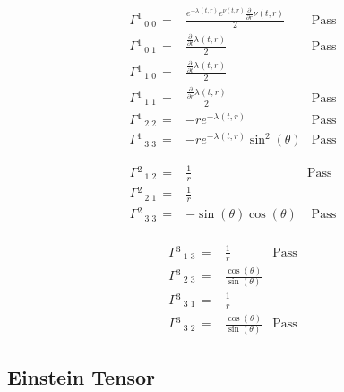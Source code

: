 \documentclass[]{article}
\begin{document}
\begin{align*}
	 {\Gamma}{}^{1}\,{}_{0}\,{}_{0}\, =& \frac{e^{- \lambda_{}{\left(t,r \right)}} e^{\nu{\left(t,r \right)}} \frac{\partial}{\partial r} \nu{\left(t,r \right)}}{2}  & \text{Pass}\\
	 {\Gamma}{}^{1}\,{}_{0}\,{}_{1}\, =& \frac{\frac{\partial}{\partial t} \lambda_{}{\left(t,r \right)}}{2}  & \text{Pass}\\
	 {\Gamma}{}^{1}\,{}_{1}\,{}_{0}\, =& \frac{\frac{\partial}{\partial t} \lambda_{}{\left(t,r \right)}}{2}\\
	 {\Gamma}{}^{1}\,{}_{1}\,{}_{1}\, =& \frac{\frac{\partial}{\partial r} \lambda_{}{\left(t,r \right)}}{2} & \text{Pass} \\
	 {\Gamma}{}^{1}\,{}_{2}\,{}_{2}\, =& - r e^{- \lambda_{}{\left(t,r \right)}}  & \text{Pass}\\
	 {\Gamma}{}^{1}\,{}_{3}\,{}_{3}\, =& - r e^{- \lambda_{}{\left(t,r \right)}} \sin^{2}{\left(\theta \right)} & \text{Pass}
\end{align*}

\begin{align*}
	 {\Gamma}{}^{2}\,{}_{1}\,{}_{2}\, =& \frac{1}{r}  & \text{Pass}	\\
	 {\Gamma}{}^{2}\,{}_{2}\,{}_{1}\, =& \frac{1}{r}	\\
	 {\Gamma}{}^{2}\,{}_{3}\,{}_{3}\, =& - \sin{\left(\theta \right)} \cos{\left(\theta \right)} &	 \text{ Pass}\\
\end{align*}

\begin{align*}
	 {\Gamma}{}^{3}\,{}_{1}\,{}_{3}\, =& \frac{1}{r} & \text{Pass}\\
	 {\Gamma}{}^{3}\,{}_{2}\,{}_{3}\, =& \frac{\cos{\left(\theta \right)}}{\sin{\left(\theta \right)}}\\
	 {\Gamma}{}^{3}\,{}_{3}\,{}_{1}\, =& \frac{1}{r}\\
	 {\Gamma}{}^{3}\,{}_{3}\,{}_{2}\, =& \frac{\cos{\left(\theta \right)}}{\sin{\left(\theta \right)}}  & \text{Pass}
\end{align*}

\subsection{Einstein Tensor}
\end{document}
